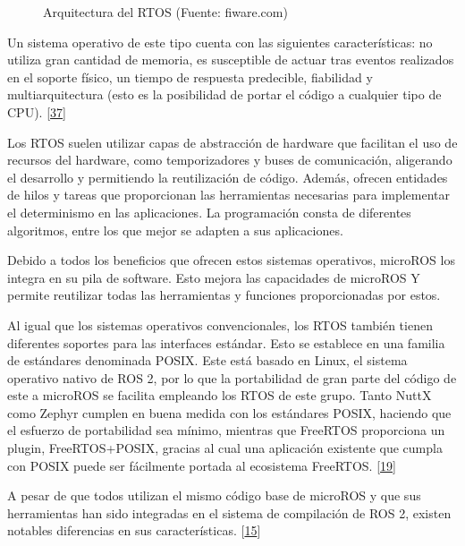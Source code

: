\documentclass[a4paper,11pt,spanish]{sphinxmanual}
\let\sphinxpxdimen\pdfpxdimen\else\newdimen\sphinxpxdimen
\begin{document}
\begin{figure}[htbp]
\centering
\capstart

\noindent\sphinxincludegraphics[width=500\sphinxpxdimen]{{micro-ROS_RTOS}.png}
\caption{Arquitectura del RTOS (Fuente: fiware.com)}\label{\detokenize{software:id28}}\end{figure}

\sphinxAtStartPar
Un sistema operativo de este tipo cuenta con las siguientes características:
no utiliza gran cantidad de memoria, es susceptible de actuar tras eventos
realizados en el soporte físico, un tiempo de respuesta predecible, fiabilidad
y multi\sphinxhyphen{}arquitectura (esto es la posibilidad de portar el código a cualquier
tipo de CPU). {[}\hyperlink{cite.marco_teorico_y_estado_del_arte:id37}{37}{]}

\sphinxAtStartPar
Los RTOS suelen utilizar capas de abstracción de hardware que facilitan
el uso de recursos del hardware, como temporizadores y buses de comunicación,
aligerando el desarrollo y permitiendo la reutilización de código.
Además, ofrecen entidades de hilos y tareas que proporcionan las
herramientas necesarias para implementar el determinismo en las aplicaciones.
La programación consta de diferentes algoritmos, entre los que mejor se adapten
a sus aplicaciones.

\sphinxAtStartPar
Debido a todos los beneficios que ofrecen estos sistemas operativos,
micro\sphinxhyphen{}ROS los integra en su pila de software. Esto mejora las capacidades
de micro\sphinxhyphen{}ROS Y permite reutilizar todas las herramientas y funciones
proporcionadas por estos.

\sphinxAtStartPar
Al igual que los sistemas operativos convencionales, los RTOS también
tienen diferentes soportes para las interfaces estándar. Esto se establece
en una familia de estándares denominada POSIX. Este  está basado en Linux,
el sistema operativo nativo de ROS 2, por lo que la portabilidad de gran parte
del código de este a micro\sphinxhyphen{}ROS se facilita empleando los RTOS de este grupo.
Tanto NuttX como Zephyr cumplen en buena medida con los estándares POSIX,
haciendo que el esfuerzo de portabilidad sea mínimo, mientras que FreeRTOS
proporciona un plugin, FreeRTOS+POSIX, gracias al cual una aplicación
existente que cumpla con POSIX puede ser fácilmente portada al ecosistema
FreeRTOS. {[}\hyperlink{cite.marco_teorico_y_estado_del_arte:id26}{19}{]}

\sphinxAtStartPar
A pesar de que todos utilizan el mismo código base de micro\sphinxhyphen{}ROS y que
sus herramientas han sido integradas en el sistema de compilación de ROS 2,
existen notables diferencias en sus características. {[}\hyperlink{cite.marco_teorico_y_estado_del_arte:id27}{15}{]}
\end{document}
